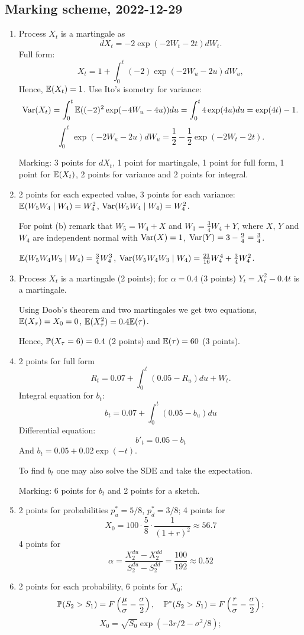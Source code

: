 \documentclass[12pt, a4paper]{article}
\begin{document}
\subsection{Marking scheme, 2022-12-29}

\begin{enumerate}
  \item Process $X_t$ is a martingale as
  \[
    dX_t = -2 \exp(-2W_t - 2t) dW_t.
  \]
  Full form:
  \[
  X_t = 1 + \int_0^t (-2)\exp(-2W_u - 2u) dW_u,  
  \]
  Hence, $\E(X_t) = 1$.
  Use Ito's isometry for variance:
  \[
    \Var(X_t) = \int_0^t \E ((-2)^2 \exp(-4W_u-4u)) du = \int_0^t 4\exp(4u) du = \exp(4t) - 1.
  \]
  \[
    \int_0^t \exp(-2W_u - 2u) dW_u = \frac{1}{2} - \frac{1}{2} \exp(-2W_t - 2t).
  \]

  Marking: 3 points for $dX_t$, 1 point for martingale, 1 point for full form, 1 point for $\E(X_t)$, 2 points for variance and 2 points for integral.

  \item 2 points for each expected value, 3 points for each variance:
  $\E(W_5 W_4 \mid W_4) = W_4^2$, $\Var(W_5 W_4 \mid W_4) = W_4^2$.

For point (b) remark that $W_5 = W_4 + X$ and $W_3 = \frac{3}{4}W_4 + Y$,
where $X$, $Y$ and $W_4$ are independent normal with $\Var(X) = 1$, $\Var(Y) = 3 - \frac{9}{4} = \frac{3}{4}$.

  $\E(W_5 W_4 W_3 \mid W_4) = \frac{3}{4}W_4^3$, $\Var(W_5 W_4 W_3 \mid W_4) = \frac{21}{16}W_4^4 + \frac{3}{4}W_4^2$.
  
  \item Process $X_t$ is a martingale (2 points); for $\alpha = 0.4$ (3 points) $Y_t =X_t^2 - 0.4t$ is a martingale.
  
  Using Doob's theorem and two martingales we get two equations, $\E(X_{\tau}) = X_0 = 0$,
  $\E(X_{\tau}^2) = 0.4 \E(\tau)$.

  Hence, $\P(X_{\tau} = 6)=0.4$ (2 points) and $\E(\tau)=60$ (3 points).
  \item 2 points for full form
  \[
    R_t = 0.07 + \int_0^t (0.05 - R_u) du + W_t.
  \]
  Integral equation for $b_t$:
  \[
  b_t = 0.07 + \int_0^t (0.05 - b_u) du  
  \]
  Differential equation:
  \[
  b'_t = 0.05 - b_t  
  \]
  And $b_t = 0.05 + 0.02 \exp(-t)$. 
  
  To find $b_t$ one may also solve the SDE and take the expectation.

  Marking: 6 points for $b_t$ and 2 points for a sketch.
  \item 2 points for probabilities $p_u^* = 5/8$, $p_d^* = 3/8$;
  4 points for  
  \[
  X_0 = 100 \cdot \frac{5}{8} \cdot \frac{1}{(1+r)^2} \approx 56.7 
  \]
  4 points for 
  \[
  \alpha =   \frac{X_2^{du} - X_2^{dd}}{S_2^{du} - S_2^{dd}} = \frac{100}{192} \approx 0.52
  \]
  \item 2 points for each probability, 6 points for $X_0$;
  \[
  \P(S_2 > S_1) = F\left(\frac{\mu}{\sigma} - \frac{\sigma}{2} \right), \quad   \P^*(S_2 > S_1) = F\left(\frac{r}{\sigma} - \frac{\sigma}{2} \right);
  \]
  \[
  X_0 = \sqrt{S_0} \exp(-3r/2 - \sigma^2/8);  
  \]

\end{enumerate}
\end{document}

